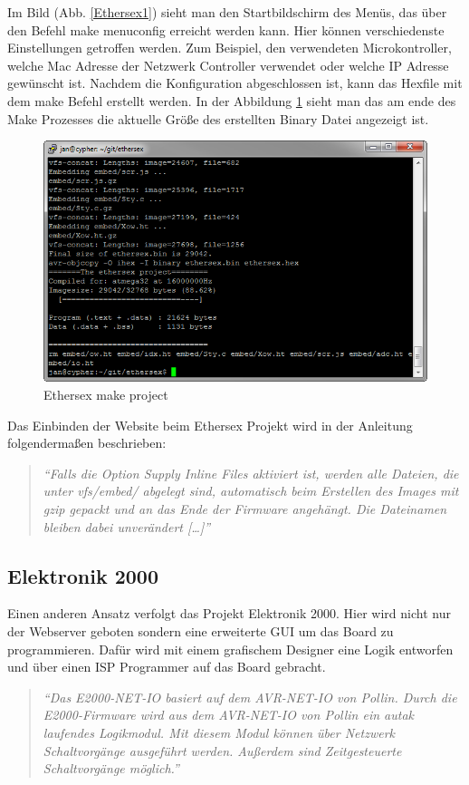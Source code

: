Im Bild (Abb. \ref{Ethersex1}) sieht man den Startbildschirm des
Menüs, das über den Befehl \textrm{make menuconfig} erreicht werden kann.
Hier können verschiedenste Einstellungen getroffen werden. Zum Beispiel, den
verwendeten Microkontroller, welche Mac Adresse der Netzwerk Controller
verwendet oder welche IP Adresse gewünscht ist.
Nachdem die Konfiguration abgeschlossen ist, kann das Hexfile mit dem
\textrm{make} Befehl erstellt werden. In der Abbildung \ref{Ethersex2} sieht man
das am ende des \textrm{Make} Prozesses die aktuelle Größe des erstellten Binary Datei
angezeigt ist.

\begin{figure}[H]
	\centering
		\includegraphics[width=13cm]{content/pictures/Recherche/Ethersex/Ethersex2.png}
	\caption{Ethersex make project}
	\label{Ethersex2}
\end{figure} 

Das Einbinden der Website beim Ethersex Projekt wird in der Anleitung
folgendermaßen beschrieben:

\begin{quote}
	\textit{
		\enquote{Falls die Option Supply Inline Files aktiviert ist, werden alle
		Dateien, die unter vfs/embed/ abgelegt sind, automatisch beim Erstellen des
		Images mit gzip gepackt und an das Ende der Firmware angehängt. Die
		Dateinamen bleiben dabei unverändert [\ldots]} }
	\cite[\url{http://www.ethersex.de/index.php/HTTPD_(Deutsch)}]{Ethersex}
\end{quote}

\subsection{Elektronik 2000}

Einen anderen Ansatz verfolgt das Projekt Elektronik 2000.
Hier wird nicht nur der Webserver geboten sondern eine erweiterte GUI um das
Board zu programmieren. Dafür wird mit einem grafischem Designer eine Logik
entworfen und über einen ISP Programmer auf das Board gebracht.

\begin{quote}
	\textit{
		\enquote{Das E2000-NET-IO basiert auf dem AVR-NET-IO von Pollin. Durch die
		E2000-Firmware wird aus dem AVR-NET-IO von Pollin ein autak laufendes
		Logikmodul. Mit diesem Modul können über Netzwerk Schaltvorgänge ausgeführt
		werden. Außerdem sind Zeitgesteuerte Schaltvorgänge möglich.} }
	\cite{elektronik2000}
\end{quote}